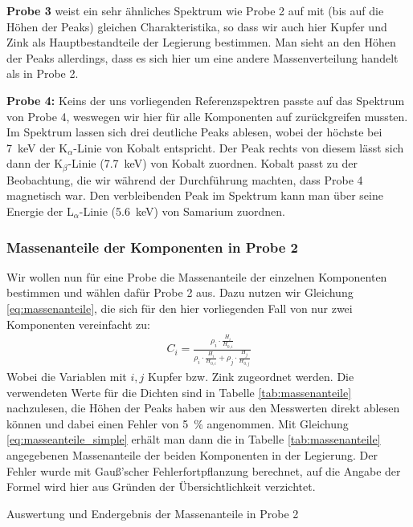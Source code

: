 \documentclass[11pt, a4paper]{article}
\begin{document}
\textbf{Probe 3} weist ein sehr ähnliches Spektrum wie Probe 2 auf mit (bis auf die Höhen der Peaks) gleichen Charakteristika, so dass wir auch hier Kupfer und Zink als Hauptbestandteile der Legierung bestimmen.
Man sieht an den Höhen der Peaks allerdings, dass es sich hier um eine andere Massenverteilung handelt als in Probe 2.



\textbf{Probe 4:} Keins der uns vorliegenden Referenzspektren passte auf das Spektrum von Probe 4, weswegen wir hier für alle Komponenten auf \cite{booklet} zurückgreifen mussten.
Im Spektrum lassen sich drei deutliche Peaks ablesen, wobei der höchste bei \SI{7}{\kilo\electronvolt} der K$_{\alpha}$-Linie von Kobalt entspricht.
Der Peak rechts von diesem lässt sich dann der K$_{\beta}$-Linie (\SI{7.7}{\kilo\electronvolt}) von Kobalt zuordnen.
Kobalt passt zu der Beobachtung, die wir während der Durchführung machten, dass Probe 4 magnetisch war.
Den verbleibenden Peak im Spektrum kann man über seine Energie der L$_{\alpha}$-Linie (\SI{5.6}{\kilo\electronvolt}) von Samarium zuordnen. 


\subsubsection{Massenanteile der Komponenten in Probe 2}

Wir wollen nun für eine Probe die Massenanteile der einzelnen Komponenten bestimmen und wählen dafür Probe 2 aus.
Dazu nutzen wir Gleichung \ref{eq:massenanteile}, die sich für den hier vorliegenden Fall von nur zwei Komponenten vereinfacht zu:
\begin{align}
C_i = \frac{\rho_i \cdot \frac{H_i}{H_{0,i}}}{\rho_i \cdot \frac{H_i}{H_{0,i}}+\rho_j \cdot \frac{H_j}{H_{0,j}}}
\label{eq:masseanteile_simple}
\end{align}
Wobei die Variablen mit $i, j$ Kupfer bzw. Zink zugeordnet werden.
Die verwendeten Werte für die Dichten sind in Tabelle \ref{tab:massenanteile} nachzulesen, die Höhen der Peaks haben wir aus den Messwerten direkt ablesen können und dabei einen Fehler von \SI{5}{\percent} angenommen.
Mit Gleichung \ref{eq:masseanteile_simple} erhält man dann die in Tabelle \ref{tab:massenanteile} angegebenen Massenanteile der beiden Komponenten in der Legierung.
Der Fehler wurde mit Gauß'scher Fehlerfortpflanzung berechnet, auf die Angabe der Formel wird hier aus Gründen der Übersichtlichkeit verzichtet.

\begin{table}[h]
\centering

\caption{Auswertung und Endergebnis der Massenanteile in Probe 2}
\label{tab:massenanteile}
\end{table}
\end{document}
